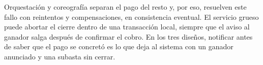 Orquestación y coreografía separan el pago del resto y, por eso, resuelven este fallo con reintentos y compensaciones, en consistencia eventual. El servicio grueso puede abortar el cierre dentro de una transacción local, siempre que el aviso al ganador salga después de confirmar el cobro. En los tres diseños, notificar antes de saber que el pago se concretó es lo que deja al sistema con un ganador anunciado y una subasta sin cerrar.
